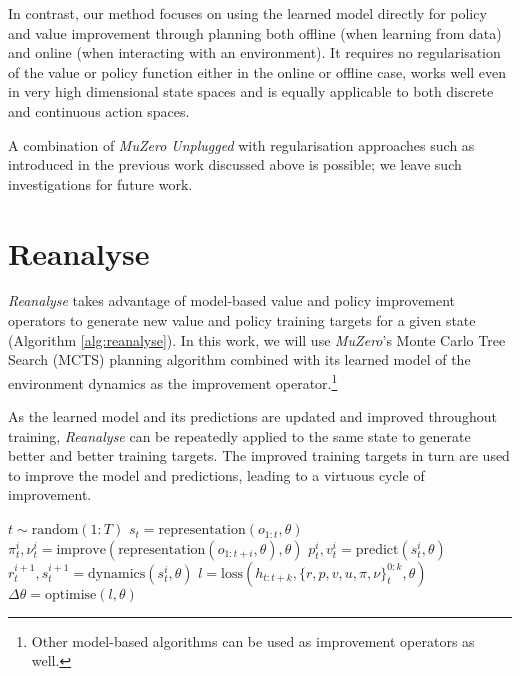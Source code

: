 \documentclass{article}
\newcommand{\muzero}{\emph{MuZero}}
\newcommand{\reanalyse}{\emph{Reanalyse}}
\newcommand{\mzunplugged}{\emph{MuZero Unplugged}}
\begin{document}
In contrast, our method focuses on using the learned model directly for policy and value improvement through planning both offline (when learning from data) and online (when interacting with an environment). It requires no regularisation of the value or policy function either in the online or offline case, works well even in very high dimensional state spaces and is equally applicable to both discrete and continuous action spaces.

A combination of \mzunplugged{} with regularisation approaches such as introduced in the previous work discussed above \cite{kidambi2020morel,yu2020mopo,rafailov2020offline} is possible; we leave such investigations for future work.

\section{Reanalyse}

\reanalyse{} takes advantage of model-based value and policy improvement operators to generate new value and policy training targets for a given state (Algorithm \ref{alg:reanalyse}). In this work, we will use \muzero{}'s Monte Carlo Tree Search (MCTS) planning algorithm combined with its learned model of the environment dynamics as the improvement operator.\footnote{Other model-based algorithms can be used as improvement operators as well.}

As the learned model and its predictions are updated and improved throughout training, \reanalyse{} can be repeatedly applied to the same state to generate better and better training targets. The improved training targets in turn are used to improve the model and predictions, leading to a virtuous cycle of improvement.

\begin{algorithm}[h]
\begin{algorithmic}
    \STATE $t \sim \textrm{random}(1:T)$
    \STATE $s_t = \textrm{representation}(o_{1:t}, \theta)$
      \STATE $\pi_t^i, \nu_t^i = \textrm{improve}(\textrm{representation}(o_{1:t+i}, \theta), \theta)$
      \STATE $p_t^i, v_t^i = \textrm{predict}(s_t^i, \theta)$
      \STATE $r_t^{i+1}, s_t^{i+1} = \textrm{dynamics}(s_t^i, \theta)$
    \ENDFOR
    \STATE $l = \textrm{loss}(h_{t:t+k}, \{r,p,v,u,\pi,\nu\}_t^{0:k}, \theta)$
    \STATE $\Delta \theta = \textrm{optimise}(l, \theta)$
  \ENDFOR

\end{algorithmic}
\caption[]{
\label{alg:reanalyse}
\textbf{The \reanalyse{} algorithm}.
}
\end{algorithm}
\end{document}
